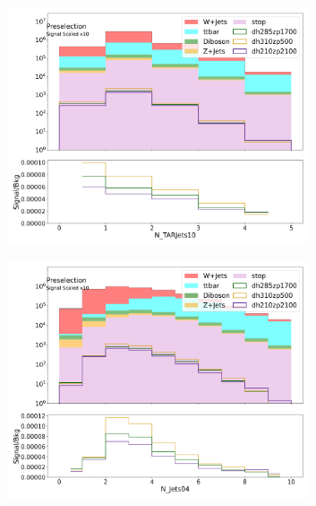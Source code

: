 \begin{figure}[htbp]
\begin{subfigure}{0.49\textwidth}
         \includegraphics[width = 0.98\textwidth]{Figures/appendix/Preselection/N_TARJets10.png}
         \caption{\NTAR}
         \end{subfigure}
         \begin{subfigure}{0.49\textwidth}
         \includegraphics[width = 0.98\textwidth]{Figures/appendix/Preselection/N_Jets04.png}
         \caption{\Njets}
         \end{subfigure}
         \begin{subfigure}{0.49\textwidth}

\end{subfigure}
\end{figure}
